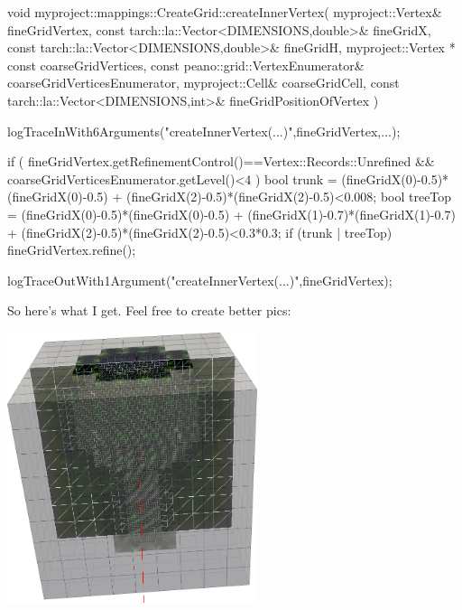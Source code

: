 \begin{code}

void myproject::mappings::CreateGrid::createInnerVertex(
 myproject::Vertex&                          fineGridVertex,
 const tarch::la::Vector<DIMENSIONS,double>& fineGridX,
 const tarch::la::Vector<DIMENSIONS,double>& fineGridH,
 myproject::Vertex * const                   coarseGridVertices,
 const peano::grid::VertexEnumerator&      coarseGridVerticesEnumerator,
 myproject::Cell&                            coarseGridCell,
 const tarch::la::Vector<DIMENSIONS,int>&    fineGridPositionOfVertex 
) {
 logTraceInWith6Arguments("createInnerVertex(...)",fineGridVertex,...);
  
 if (
   fineGridVertex.getRefinementControl()==Vertex::Records::Unrefined 
   &&
   coarseGridVerticesEnumerator.getLevel()<4
 ) {
   bool trunk = (fineGridX(0)-0.5)*(fineGridX(0)-0.5)
              + (fineGridX(2)-0.5)*(fineGridX(2)-0.5)<0.008;
   bool treeTop = (fineGridX(0)-0.5)*(fineGridX(0)-0.5)
                + (fineGridX(1)-0.7)*(fineGridX(1)-0.7)
                + (fineGridX(2)-0.5)*(fineGridX(2)-0.5)<0.3*0.3;
   if (trunk | treeTop) {
     fineGridVertex.refine();
   }
 }

 logTraceOutWith1Argument("createInnerVertex(...)",fineGridVertex);
}
\end{code}

So here's what I get. Feel free to create better pics:

\begin{center}
  \includegraphics[width=0.55\textwidth]{2_quickstart/tree.png}
\end{center}

